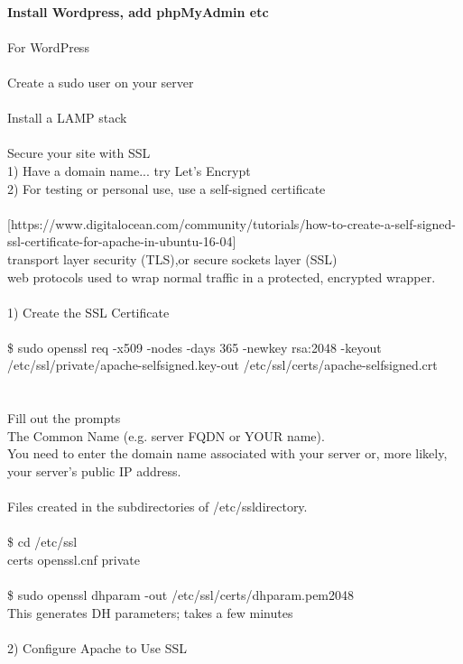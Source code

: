 \documentclass[10pt,a4paper]{article}
\begin{document}
{{{{{{{{{{{{{{{{{{\\
\textbf{Install Wordpress, add phpMyAdmin etc}}{\large \\
\\
For WordPress\\
\\
Create a sudo user on your server\\
\\
Install a LAMP stack\\
\\
Secure your site with SSL}{\large \\
	1) Have a domain name... try Let's Encrypt\\
	2) For testing or personal use, use a self-signed certificate\\
\\
[https://www.digitalocean.com/community/tutorials/how-to-create-a-self-signed-ssl-certificate-for-apache-in-ubuntu-16-04}{\large ]\\
transport layer security (TLS),or  secure sockets layer (SSL)\\
web protocols used to wrap normal traffic in a protected, encrypted wrapper.\\
\\
1) Create the SSL Certificate\\
\\
\$ sudo openssl req -x509 -nodes -days 365 -newkey rsa:2048 -keyout /etc/ssl/private/apache-selfsigned.key}{\large  -out /etc/ssl/certs/apache-selfsigned.crt}{\large \\
\\
\\
Fill out the prompts\\
The Common Name (e.g. server FQDN or YOUR name). \\
You need to enter the domain name associated with your server or, more likely, your server's public IP address.\\
\\
Files created in the subdirectories of /etc/ssl}{\large  directory.\\
\\
\$ cd /etc/ssl}{\large \\
certs  openssl.cnf  private\\
\\
\$ sudo openssl dhparam -out /etc/ssl/certs/dhparam.pem}{\large  2048\\
This generates DH parameters; takes a few minutes\\
\\
2) Configure Apache to Use SSL\\
}}}}}}}}}}}}}}}}}}
\end{document}
